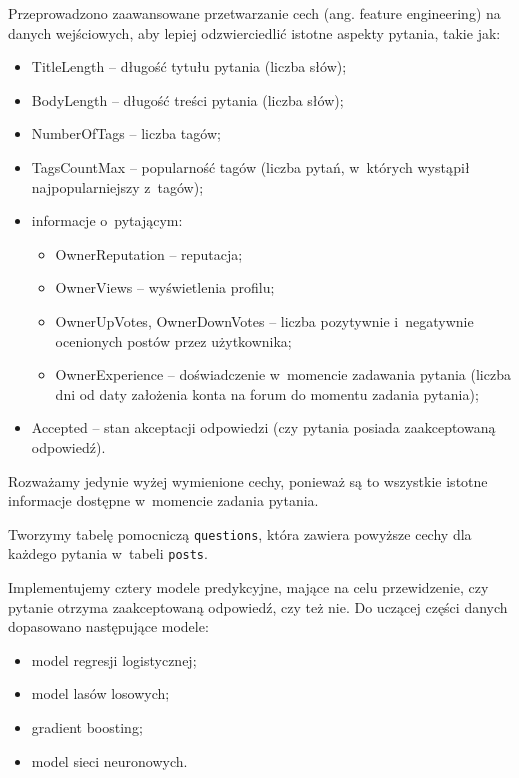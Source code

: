 \documentclass[12pt]{article}
\begin{document}
	\vspace{0.25cm}

	Przeprowadzono zaawansowane przetwarzanie cech (ang. feature engineering) na danych wejściowych, aby lepiej odzwierciedlić istotne aspekty pytania, takie jak:
	\begin{itemize}
		\item TitleLength -- długość tytułu pytania (liczba słów);
		\item BodyLength -- długość treści pytania (liczba słów);
		\item NumberOfTags -- liczba tagów;
		\item TagsCountMax -- popularność tagów (liczba pytań, w~których wystąpił najpopularniejszy z~tagów);
		\item informacje o~pytającym:
		\begin{itemize}
			\item OwnerReputation -- reputacja;
			\item OwnerViews -- wyświetlenia profilu;
			\item OwnerUpVotes, OwnerDownVotes -- liczba pozytywnie i~negatywnie ocenionych postów przez użytkownika;
			\item OwnerExperience -- doświadczenie w~momencie zadawania pytania (liczba dni od daty założenia konta na forum do momentu zadania pytania);
		\end{itemize}
		\item Accepted -- stan akceptacji odpowiedzi (czy pytania posiada zaakceptowaną odpowiedź).
	\end{itemize}
	Rozważamy jedynie wyżej wymienione cechy, ponieważ są to wszystkie istotne informacje dostępne w~momencie zadania pytania.

	\vspace{0.25cm}

	Tworzymy tabelę pomocniczą \verb|questions|, która zawiera powyższe cechy dla każdego pytania w~tabeli \verb|posts|.

	\vspace{0.25cm}

	Implementujemy cztery modele predykcyjne, mające na celu przewidzenie, czy pytanie otrzyma zaakceptowaną odpowiedź, czy też nie.
	Do uczącej części danych dopasowano następujące modele:
	\begin{itemize}
		\item model regresji logistycznej;
		\item model lasów losowych;
		\item gradient boosting;
		\item model sieci neuronowych.
	\end{itemize}
\end{document}
